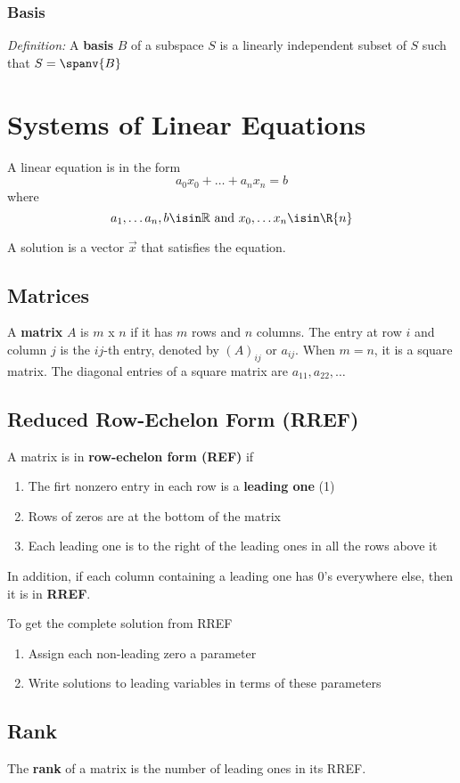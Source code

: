 \documentclass[12pt]{article}
\begin{document}
\subsubsection*{Basis}
\textit{Definition:} A {\bf basis} $B$ of a subspace $S$ is a linearly independent subset of $S$ such that $S = \spanv{B}$

\section*{Systems of Linear Equations}
A linear equation is in the form \[ a_0x_0 + \dots + a_nx_n = b \] where \[ a_1,\dots a_n, b\isin\mathbb{R} \text{ and } x_0,\dots x_n\isin\R{n} \]

A solution is a vector $\vec{x}$ that satisfies the equation.

\subsection*{Matrices}
A {\bf matrix} $A$ is $m$ x $n$ if it has $m$ rows and $n$ columns. The entry at row $i$ and column $j$ is the $ij$-th entry, denoted by $(A)_{ij}$ or $a_{ij}$. When $m=n$, it is a square matrix. The diagonal entries of a square matrix are $a_{11}, a_{22}, \dots $

\subsection*{Reduced Row-Echelon Form (RREF)}
A matrix is in {\bf row-echelon form (REF)} if
\begin{enumerate}
\item The firt nonzero entry in each row is a {\bf leading one} (1)
\item Rows of zeros are at the bottom of the matrix
\item Each leading one is to the right of the leading ones in all the rows above it
\end{enumerate}

In addition, if each column containing a leading one has 0's everywhere else, then it is in {\bf RREF}.

To get the complete solution from RREF
\begin{enumerate}
\item Assign each non-leading zero a parameter
\item Write solutions to leading variables in terms of these parameters
\end{enumerate}

\subsection*{Rank}
The {\bf rank} of a matrix is the number of leading ones in its RREF.
\end{document}
